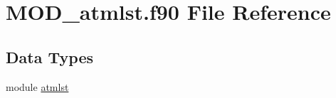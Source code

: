 \hypertarget{MOD__atmlst_8f90}{\section{M\-O\-D\-\_\-atmlst.\-f90 File Reference}
\label{MOD__atmlst_8f90}
}
\subsection*{Data Types}
\begin{DoxyCompactItemize}
\item 
module \hyperlink{classatmlst}{atmlst}
\end{DoxyCompactItemize}
